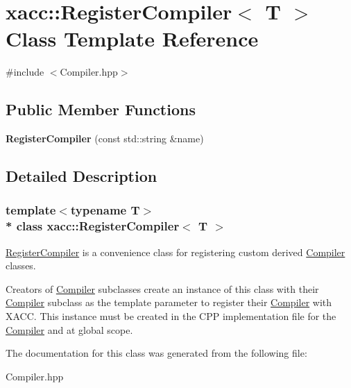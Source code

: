 \hypertarget{a00053}{}\section{xacc\+:\+:Register\+Compiler$<$ T $>$ Class Template Reference}
\label{a00053}


{\ttfamily \#include $<$Compiler.\+hpp$>$}

\subsection*{Public Member Functions}
\begin{DoxyCompactItemize}
\item 
{\bfseries Register\+Compiler} (const std\+::string \&name)\hypertarget{a00053_a41f5c1abd570b3867b9790cdc02f3355}{}\label{a00053_a41f5c1abd570b3867b9790cdc02f3355}

\end{DoxyCompactItemize}


\subsection{Detailed Description}
\subsubsection*{template$<$typename T$>$\\*
class xacc\+::\+Register\+Compiler$<$ T $>$}

\hyperlink{a00053}{Register\+Compiler} is a convenience class for registering custom derived \hyperlink{a00020}{Compiler} classes.

Creators of \hyperlink{a00020}{Compiler} subclasses create an instance of this class with their \hyperlink{a00020}{Compiler} subclass as the template parameter to register their \hyperlink{a00020}{Compiler} with X\+A\+CC. This instance must be created in the C\+PP implementation file for the \hyperlink{a00020}{Compiler} and at global scope. 

The documentation for this class was generated from the following file\+:\begin{DoxyCompactItemize}
\item 
Compiler.\+hpp\end{DoxyCompactItemize}

